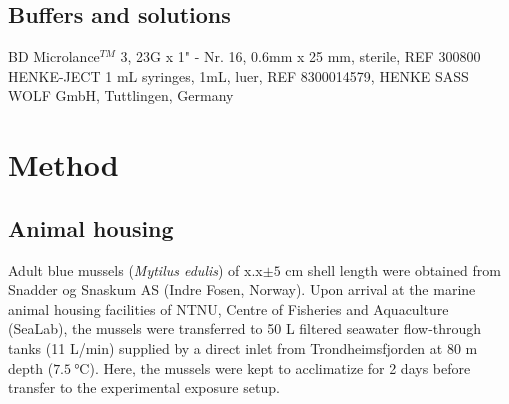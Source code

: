 \subsection{Buffers and solutions}
\begin{table}[H]
	\centering
	\label{tb:buffers}
\end{table}

BD Microlance$^{TM}$ 3, 23G x 1" - Nr. 16, 0.6mm x 25 mm, sterile, REF 300800
HENKE-JECT 1 mL syringes, 1mL, luer, REF 8300014579, HENKE SASS WOLF GmbH, Tuttlingen, Germany

\section{Method}
\subsection{Animal housing}
Adult blue mussels (\emph{Mytilus edulis}) of x.x$\pm{5}$ cm shell length were obtained from Snadder og Snaskum AS (Indre Fosen, Norway). Upon arrival at the marine animal housing facilities of NTNU, Centre of Fisheries and Aquaculture (SeaLab), the mussels were transferred to 50 L filtered seawater flow-through tanks (11 L/min) supplied by a direct inlet from Trondheimsfjorden at 80 m depth ($\SI{7.5}{\celsius}$). Here, the mussels were kept to acclimatize for 2 days before transfer to the experimental exposure setup.

